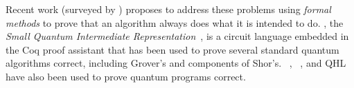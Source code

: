 


Recent work (surveyed by \citet{chareton2021formal}) proposes to address these problems using \emph{formal methods} to prove that an algorithm always does what it is intended to do.
\sqir, the \emph{Small Quantum Intermediate Representation}~\cite{PQPC}, is a circuit language embedded in the Coq proof
assistant that has been used to prove several standard quantum
algorithms correct, including Grover's and components of Shor's.
\qbricks~\cite{qbricks}, \qwire~\cite{Rand2017}, and QHL~\cite{qhoare}
have also been used to prove quantum programs correct.


